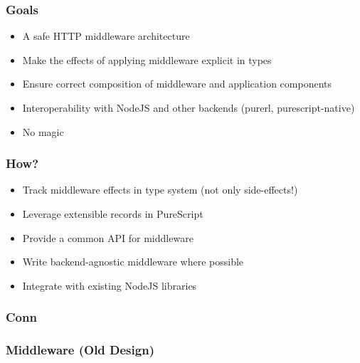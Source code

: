 \begin{frame}
  \frametitle{Goals}
  \begin{itemize}
    \pause
    \item<+-> A safe HTTP middleware architecture
    \item<+-> Make the effects of applying middleware explicit in types
    \item<+-> Ensure correct composition of middleware and application components
    \item<+-> Interoperability with NodeJS and other backends (purerl, purescript-native)
    \item<+-> No magic
  \end{itemize}
\end{frame}

\begin{frame}
  \frametitle{How?}
  \begin{itemize}
    \pause
    \item<+-> Track middleware effects in type system (not only side-effects!)
    \item<+-> Leverage extensible records in PureScript
    \item<+-> Provide a common API for middleware
    \item<+-> Write backend-agnostic middleware where possible
    \item<+-> Integrate with existing NodeJS libraries
  \end{itemize}
\end{frame}

\begin{frame}
\end{frame}

\begin{frame}
  \frametitle{Conn}
  
\end{frame}


\begin{frame}
  \frametitle{Middleware (Old Design)}
  
\end{frame}

